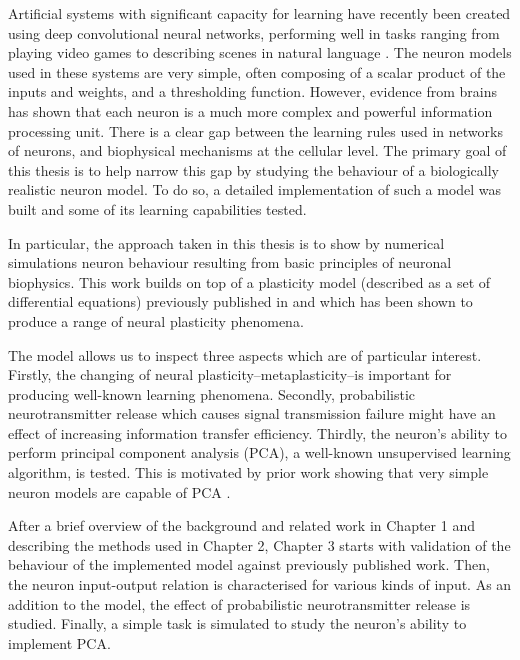 \documentclass[a4paper,12pt]{report}
\theoremstyle{definition}
\begin{document}
Artificial systems with significant capacity for learning have recently been created using deep convolutional neural networks, performing well in tasks ranging from playing video games \cite{mnih2015human} to describing scenes in natural language \cite{karpathy2014deep}. The neuron models used in these systems are very simple, often composing of a scalar product of the inputs and weights, and a thresholding function. However, evidence from brains has shown that each neuron is a much more complex and powerful information processing unit. There is a clear gap between the learning rules used in networks of neurons, and biophysical mechanisms at the cellular level. The primary goal of this thesis is to help narrow this gap by studying the behaviour of a biologically realistic neuron model. To do so, a detailed implementation of such a model was built and some of its learning capabilities tested. 

In particular, the approach taken in this thesis is to show by numerical simulations neuron behaviour resulting from basic principles of neuronal biophysics. This work builds on top of a plasticity model (described as a set of differential equations) previously published in \cite{yeung2004synaptic} and which has been shown to produce a range of neural plasticity phenomena. 

The model allows us to inspect three aspects which are of particular interest. Firstly, the changing of neural plasticity--metaplasticity--is important for producing well-known learning phenomena. Secondly, probabilistic neurotransmitter release which causes signal transmission failure might have an effect of increasing information transfer efficiency. Thirdly, the neuron's ability to perform principal component analysis (PCA), a well-known unsupervised learning algorithm, is tested. This is motivated by prior work showing that very simple neuron models are capable of PCA \cite{oja2008oja}.

After a brief overview of the background and related work in Chapter 1 and describing the methods used in Chapter 2, Chapter 3 starts with validation of the behaviour of the implemented model against previously published work. Then, the neuron input-output relation is characterised for various kinds of input. As an addition to the model, the effect of probabilistic neurotransmitter release is studied. Finally, a simple task is simulated to study the neuron's ability to implement PCA.


\end{document}
